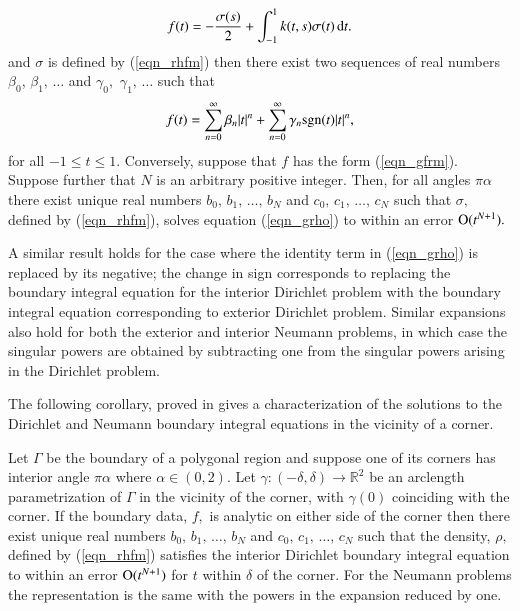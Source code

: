 \begin{theorem}
\begin{align}
f(t) = -\frac{\sigma(s)}{2} +\int_{-1}^1 k(t,s)  \sigma(t)\,{\rm d}t.
\label{eqn_grho}
\end{align}
and $\sigma$ is defined by (\ref{eqn_rhfm}) then there exist two sequences of real numbers $\beta_0$, $\beta_1,\,\dots$ and $\gamma_0,$ $\gamma_1,\,\dots$ such that
\begin{align}
f(t) = \sum_{n=0}^\infty\beta_n |t|^n + \sum_{n=0}^\infty \gamma_n {\rm sgn}(t) |t|^n,
\label{eqn_gfrm}
\end{align}
for all $-1 \le t \le 1.$ Conversely, suppose that $f$ has the form (\ref{eqn_gfrm}). Suppose further that $N$ is an arbitrary positive integer. Then, for all angles $\pi \alpha$ there exist unique real numbers $b_0,\,b_1,\,\dots,\,b_N$ and $c_0,\,c_1,\,\dots,\,c_N$ such that $\sigma,$ defined by (\ref{eqn_rhfm}), solves equation  (\ref{eqn_grho}) to within an error ${\rm O}(t^{N+1}).$ 
\end{theorem}

A similar result holds for the case where the identity term in (\ref{eqn_grho}) is replaced by its negative; the change in sign corresponds to replacing the boundary integral equation for the interior Dirichlet problem with the boundary integral equation corresponding to exterior Dirichlet problem. Similar expansions also hold for both the exterior and interior Neumann problems, in which case the singular powers are obtained by subtracting one from the singular powers arising in the Dirichlet problem.


The following corollary, proved in \cite{serkhacha} gives a characterization of the solutions to the Dirichlet and Neumann boundary integral equations in the vicinity of a corner.

\begin{corollary}
Let $\Gamma$ be the boundary of a polygonal region and suppose one of its corners has interior angle $\pi \alpha$ where $\alpha \in (0,2).$ Let $\gamma:(-\delta,\delta) \rightarrow \mathbb{R}^2$ be an arclength parametrization of $\Gamma$ in the vicinity of the corner, with $\gamma(0)$ coinciding with the corner. If the boundary data, $f,$ is analytic on either side of the corner then there exist unique real numbers $b_0,\,b_1,\,\dots,\,b_N$ and $c_0,\,c_1,\,\dots,\,c_N$ such that the density, $\rho,$ defined by (\ref{eqn_rhfm}) satisfies the interior Dirichlet boundary integral equation to within an error ${\rm O}(t^{N+1})$ for $t$ within $\delta$ of the corner. For the Neumann problems the representation is the same with the powers in the expansion reduced by one.
\end{corollary}
